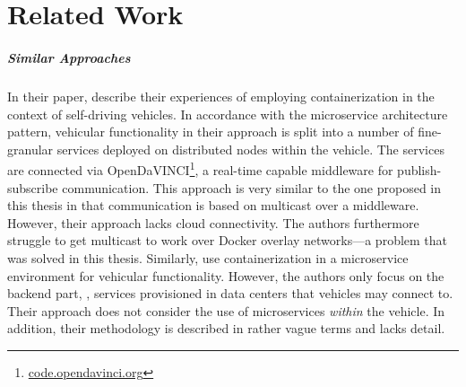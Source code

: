 \chapter{Related Work}\label{chapter:related-work}

\paragraph{Similar Approaches}

In their paper, \citeauthor*{berger2017containerized} \cite{berger2017containerized} describe their experiences of employing containerization in the context of self-driving vehicles.
In accordance with the microservice architecture pattern, vehicular functionality in their approach is split into a number of fine-granular services deployed on distributed nodes within the vehicle. The services are connected via OpenDaVINCI\footnote{\url{code.opendavinci.org}}, a real-time capable middleware for publish-subscribe communication. This approach is very similar to the one proposed in this thesis in that communication is based on multicast over a middleware. However, their approach lacks cloud connectivity. The authors furthermore struggle to get multicast to work over Docker overlay networks---a problem that was solved in this thesis.
Similarly, \citeauthor*{schneider2016achieving} \cite{schneider2016achieving} use containerization in a microservice environment for vehicular functionality. However, the authors only focus on the backend part, \ie , services provisioned in data centers that vehicles may connect to. Their approach does not consider the use of microservices \emph{within} the vehicle. In addition, their methodology is described in rather vague terms and lacks detail.

